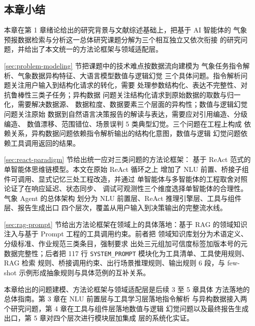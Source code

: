 
\subsection{本章小结}
\label{sec:problem-summary}

本章在第 1 章绪论给出的研究背景与文献综述基础上，把基于 AI 智能体的
气象预报数据检索与分析这一总体研究课题分解为三个相互独立又依次衔接
的研究问题，并给出了本文统一的方法论框架与领域适配层。

\ref{sec:problem-modeling} 节把课题中的技术难点按数据流向建模为
气象任务指令解析、气象数据异构特征、大语言模型数值与逻辑幻觉
三个具体问题。指令解析问题关注用户输入到结构化请求的转化，需要
处理参数结构化、表达不完整性、对抗鲁棒性三类子任务；异构数据
问题关注结构化请求到原始数据的取数与归一化，需要解决数据源、
数据粒度、数据要素三个层面的异构性；数值与逻辑幻觉问题关注原始
数据到自然语言决策报告的解读与表达，需要应对引用编造、分级编造、
数值漂移、范围错位、场景误判 5 类典型幻觉。三个问题在工程上构成
依赖关系，异构数据问题依赖指令解析输出的结构化意图，数值与逻辑
幻觉问题依赖工具调用返回的结果。

\ref{sec:react-paradigm} 节给出统一应对三类问题的方法论框架：
基于 ReAct 范式的单智能体思维链模型。本文在原始 ReAct 循环之上
增加了 NLU 前置、桥接子组件可调用、显式记忆三处工程改造，并通过
单智能体与多智能体的工程取舍对照论证了在响应延迟、状态同步、
调试可观测性三个维度选择单智能体的合理性。气象 Agent 的总体架构
划分为 NLU 前置层、ReAct 推理引擎层、工具与组件层、报告生成出口
四个层次，覆盖从用户输入到决策输出的完整流水线。

\ref{sec:rag-prompt} 节给出方法论框架在领域上的具体落地：基于
RAG 的领域知识注入与基于 Prompt 工程的工具调用约束。前者把
领域知识库划分为术语定义、分级标准、作业规范三类条目，强制要求
出处三元组加可信度标签加版本号的元数据完整性；后者把 117 行
\texttt{SYSTEM\_\bk{}PROMPT} 模块化为工具清单、工具使用规则、RAG 检索
规则、桥接调用约束、出行场景推理规则、输出规则 6 段，与
few-shot 示例形成抽象规则与具体范例的互补关系。

本章给出的问题建模、方法论框架与领域适配层是后续 3 至 5 章具体
方法落地的总体指南。第 3 章在 NLU 前置层与工具学习层落地指令解析
与异构数据接入两个研究问题，第 4 章在工具与组件层落地数值与逻辑
幻觉问题以及最终报告生成出口，第 5 章对四个层次进行模块层加集成
层的系统化实证。

